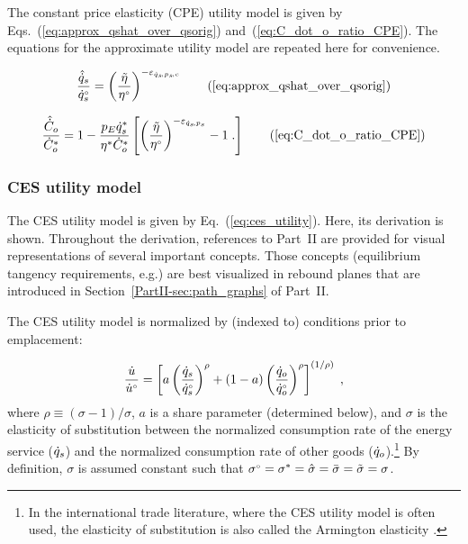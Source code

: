 \documentclass[12pt]{article}\usepackage[]{graphicx}\usepackage[]{xcolor}
\begin{document}
The constant price elasticity (CPE) utility model is given
by Eqs.~(\ref{eq:approx_qshat_over_qsorig})
and~(\ref{eq:C_dot_o_ratio_CPE}).
The equations for the approximate utility model are repeated here
for convenience.

\begin{equation} 
  \frac{\rasub{q}_s}{\rbempl{q}_s}
      = \left( \frac{\amacro{\eta}}{\bempl{\eta}} \right)^{-\eqspsC} 
        \tag{\ref{eq:approx_qshat_over_qsorig}}
\end{equation}

\begin{equation}
  \frac{\rasub{C}_o}{\rbsub{C}_o} = 1 - \frac{p_E \rbsub{q}_s}{\bsub{\eta}  \rbsub{C}_o} \left[ \left( \etaratiostacked \right)^{-\eqspsUC} - 1 \; . \right]
 \tag{\ref{eq:C_dot_o_ratio_CPE}}
\end{equation}


\subsubsection{CES utility model}
\label{sec:derivation_ces_utility}

The CES utility model is given by Eq.~(\ref{eq:ces_utility}).
Here, its derivation is shown.
Throughout the derivation, 
references to Part~II are provided
for visual representations  
of several important concepts. 
Those concepts (equilibrium tangency requirements, e.g.)
are best visualized in rebound planes that are 
introduced in Section~\ref{PartII-sec:path_graphs} of Part~II.

The CES utility model
is normalized by (indexed to) conditions prior to emplacement:

\begin{equation}
  \frac{\dot{u}}{{}{\dot{u}}^{\scriptscriptstyle \circ}} = 
  \left[ a \left( \frac{\dot{q}_s}{{}{\dot{q}}^{\scriptscriptstyle \circ}_s} \right)^\rho 
        + (1-a) \left( \frac{\dot{q}_o}{{}{\dot{q}}^{\scriptscriptstyle \circ}_o} \right)^\rho  \right]^{(1/\rho)} \; ,
\end{equation}
%
where $\rho \equiv (\sigma - 1)/\sigma$,
$a$ is a share parameter (determined below), and 
$\sigma$ is the elasticity of substitution between
the normalized consumption rate of the energy service ($\dot{q}_s$) and 
the normalized consumption rate of other goods ($\dot{q}_o$).\footnote{In the
international trade literature, where the CES utility model is
often used, the elasticity of substitution is also called the Armington elasticity \citep{Feenstra2018}.}
By definition, $\sigma$ is assumed constant such that
${}{\sigma}^{\scriptscriptstyle \circ} = {\sigma}^* = \hat{\sigma} = \bar{\sigma} = \tilde{\sigma} = \sigma$.
\end{document}
